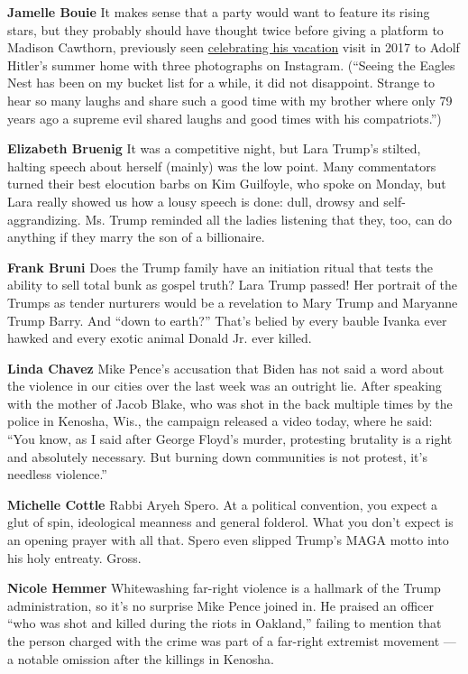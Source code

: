 \textbf{Jamelle Bouie} It makes sense that a party would want to feature
its rising stars, but they probably should have thought twice before
giving a platform to Madison Cawthorn, previously seen
\href{https://www.cnn.com/2020/08/13/politics/madison-cawthorn-social-media-post/index.html}{celebrating
his vacation} visit in 2017 to Adolf Hitler's summer home with three
photographs on Instagram. (``Seeing the Eagles Nest has been on my
bucket list for a while, it did not disappoint. Strange to hear so many
laughs and share such a good time with my brother where only 79 years
ago a supreme evil shared laughs and good times with his compatriots.'')

\textbf{Elizabeth Bruenig} It was a competitive night, but Lara Trump's
stilted, halting speech about herself (mainly) was the low point. Many
commentators turned their best elocution barbs on Kim Guilfoyle, who
spoke on Monday, but Lara really showed us how a lousy speech is done:
dull, drowsy and self-aggrandizing. Ms. Trump reminded all the ladies
listening that they, too, can do anything if they marry the son of a
billionaire.

\textbf{Frank Bruni} Does the Trump family have an initiation ritual
that tests the ability to sell total bunk as gospel truth? Lara Trump
passed! Her portrait of the Trumps as tender nurturers would be a
revelation to Mary Trump and Maryanne Trump Barry. And ``down to
earth?'' That's belied by every bauble Ivanka ever hawked and every
exotic animal Donald Jr. ever killed.

\textbf{Linda Chavez} Mike Pence's accusation that Biden has not said a
word about the violence in our cities over the last week was an outright
lie. After speaking with the mother of Jacob Blake, who was shot in the
back multiple times by the police in Kenosha, Wis., the campaign
released a video today, where he said: ``You know, as I said after
George Floyd's murder, protesting brutality is a right and absolutely
necessary. But burning down communities is not protest, it's needless
violence.''

\textbf{Michelle Cottle} Rabbi Aryeh Spero. At a political convention,
you expect a glut of spin, ideological meanness and general folderol.
What you don't expect is an opening prayer with all that. Spero even
slipped Trump's MAGA motto into his holy entreaty. Gross.

\textbf{Nicole Hemmer} Whitewashing far-right violence is a hallmark of
the Trump administration, so it's no surprise Mike Pence joined in. He
praised an officer ``who was shot and killed during the riots in
Oakland,'' failing to mention that the person charged with the crime was
part of a far-right extremist movement --- a notable omission after the
killings in Kenosha.

